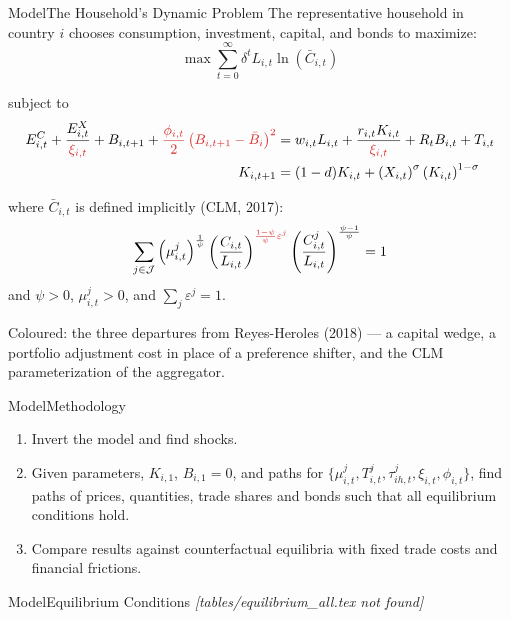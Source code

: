 \documentclass[10pt]{beamer}
\newcommand{\dev}[1]{\textcolor{dev}{#1}}
\newcommand{\ap}[1]{%
  \hyperlink{#1}{\structure{\textsuperscript{\tiny$\blacktriangleright$}}}}
\begin{document}
\begin{frame}{Model}{The Household's Dynamic Problem}\label{fr:hh}
  \small
  The representative household in country $i$ chooses consumption, investment,
  capital, and bonds to maximize:
  \begin{equation*}
    \max \sum_{t=0}^{\infty} \delta^t L_{i,t} \ln \left(\bar{C}_{i,t}\right)
  \end{equation*}

  \vspace{4pt}
  subject to
  \begin{align*}
    E^C_{i,t} + \frac{E^X_{i,t}}{\dev{\xi_{i,t}}} + B_{i,t+1}
      + \dev{\frac{\phi_{i,t}}{2}\left(B_{i,t+1}-\bar{B}_i\right)^2}
      &= w_{i,t} L_{i,t} + \frac{r_{i,t} K_{i,t}}{\dev{\xi_{i,t}}} + R_t B_{i,t} + T_{i,t} \\
    K_{i,t+1} &= (1-d) K_{i,t} + \left(X_{i,t}\right)^\sigma \left(K_{i,t}\right)^{1-\sigma}
  \end{align*}

  \vspace{4pt}
  where $\bar{C}_{i,t}$ is defined implicitly (CLM, 2017):
  \begin{equation*}
    \sum_{j \in \mathcal{J}} \left(\mu^j_{i,t}\right)^{\frac{1}{\psi}}
    \left(\frac{C_{i,t}}{L_{i,t}}\right)^{\dev{\frac{1-\psi}{\psi}\varepsilon^j}}
    \left(\frac{C^j_{i,t}}{L_{i,t}}\right)^{\frac{\psi-1}{\psi}} = 1
  \end{equation*}
  and $\psi > 0$, $\mu^j_{i,t} > 0$, and $\sum_j \varepsilon^j = 1$.\ap{ap:cal}

  {\footnotesize \dev{Coloured}: the three departures from Reyes-Heroles (2018) --- a
  capital wedge, a portfolio adjustment cost in place of a preference shifter, and the CLM
  parameterization of the aggregator.}
\end{frame}
\begin{frame}{Model}{Methodology}\label{fr:meth}
  \vfill
  \linespread{1.3}\selectfont
  \begin{enumerate}\itemsep12pt
    \item Invert the model and find shocks.
    \item Given parameters, $K_{i,1}$, $B_{i,1}=0$, and paths for
          $\{\mu^j_{i,t},T^j_{i,t},\tau^j_{ih,t},\xi_{i,t},\phi_{i,t}\}$, find
          paths of prices, quantities, trade shares and bonds such that all
          equilibrium conditions hold.\ap{ap:ek}
    \item Compare results against counterfactual equilibria with fixed trade
          costs and financial frictions.
  \end{enumerate}
  \vfill
\end{frame}
\begin{frame}[fragile]{Model}{Equilibrium Conditions\ap{ap:mc}}
  \centering
  \tiny
    {\scalebox{0.92}{}}
    {\normalsize\textit{[tables/equilibrium\_all.tex not found]}}
\end{frame}
\end{document}
